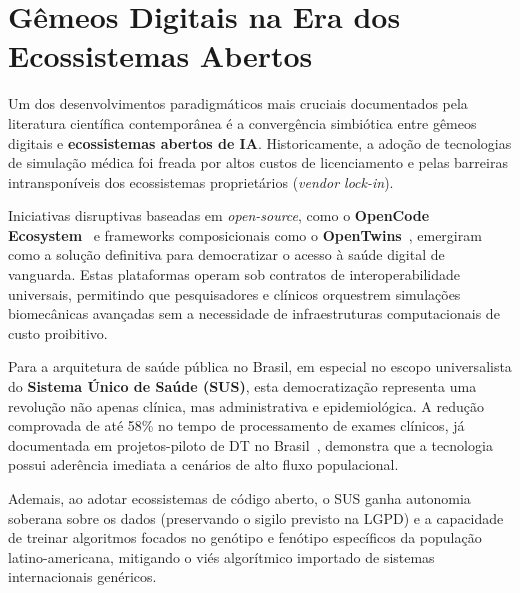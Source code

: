 \section{Gêmeos Digitais na Era dos Ecossistemas Abertos}

Um dos desenvolvimentos paradigmáticos mais cruciais documentados pela literatura científica contemporânea é a convergência simbiótica entre gêmeos digitais e \textbf{ecossistemas abertos de IA}. Historicamente, a adoção de tecnologias de simulação médica foi freada por altos custos de licenciamento e pelas barreiras intransponíveis dos ecossistemas proprietários (\textit{vendor lock-in}). 

Iniciativas disruptivas baseadas em \textit{open-source}, como o \textbf{OpenCode Ecosystem}~\cite{opencode2026ecosystem} e frameworks composicionais como o \textbf{OpenTwins}~\cite{robles2023opentwins, infante2024integrating}, emergiram como a solução definitiva para democratizar o acesso à saúde digital de vanguarda. Estas plataformas operam sob contratos de interoperabilidade universais, permitindo que pesquisadores e clínicos orquestrem simulações biomecânicas avançadas sem a necessidade de infraestruturas computacionais de custo proibitivo.

Para a arquitetura de saúde pública no Brasil, em especial no escopo universalista do \textbf{Sistema Único de Saúde (SUS)}, esta democratização representa uma revolução não apenas clínica, mas administrativa e epidemiológica. A redução comprovada de até 58\% no tempo de processamento de exames clínicos, já documentada em projetos-piloto de DT no Brasil~\cite{frota2025sus, abinc2026brasil}, demonstra que a tecnologia possui aderência imediata a cenários de alto fluxo populacional.

Ademais, ao adotar ecossistemas de código aberto, o SUS ganha autonomia soberana sobre os dados (preservando o sigilo previsto na LGPD) e a capacidade de treinar algoritmos focados no genótipo e fenótipo específicos da população latino-americana, mitigando o viés algorítmico importado de sistemas internacionais genéricos.
